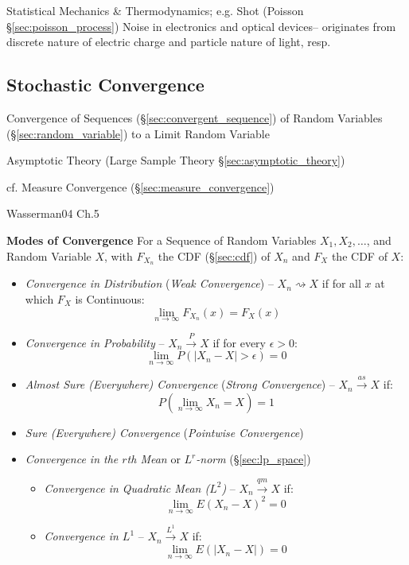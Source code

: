 Statistical Mechanics \& Thermodynamics; e.g. Shot (Poisson
\S\ref{sec:poisson_process}) Noise in electronics and optical devices--
originates from discrete nature of electric charge and particle nature of light,
resp.



\subsection{Stochastic Convergence}\label{sec:stochastic_convergence}

Convergence of Sequences (\S\ref{sec:convergent_sequence}) of Random Variables
(\S\ref{sec:random_variable}) to a Limit Random Variable

\fist Asymptotic Theory (Large Sample Theory \S\ref{sec:asymptotic_theory})

\fist cf. Measure Convergence (\S\ref{sec:measure_convergence})

Wasserman04 Ch.5

\textbf{Modes of Convergence}
For a Sequence of Random Variables $X_1, X_2, \ldots$, and Random Variable $X$,
with $F_{X_n}$ the CDF (\S\ref{sec:cdf}) of $X_n$ and $F_X$ the CDF of $X$:
\begin{itemize}
  \item \emph{Convergence in Distribution} (\emph{Weak Convergence}) --
    $X_n \rightsquigarrow X$ if for all $x$ at which $F_X$ is Continuous:
    \[
      \lim_{n\to\infty} F_{X_n}(x) = F_X(x)
    \]
  \item \emph{Convergence in Probability} -- $X_n \xrightarrow{P} X$ if for
    every $\epsilon > 0$:
    \[
      \lim_{n\to\infty}P(|X_n - X| > \epsilon) = 0
    \]
  \item \emph{Almost Sure (Everywhere) Convergence} (\emph{Strong Convergence})
    -- $X_n \xrightarrow{as} X$ if:
    \[
      P(\lim_{n\to\infty}X_n = X) = 1
    \]
  \item \emph{Sure (Everywhere) Convergence} (\emph{Pointwise Convergence})
  \item \emph{Convergence in the $r$th Mean} or \emph{$L^r$-norm}
    (\S\ref{sec:lp_space})
    \begin{itemize}
      \item \emph{Convergence in Quadratic Mean ($L^2$)} --
        $X_n \xrightarrow{qm} X$ if:
        \[
          \lim_{n\to\infty} E(X_n - X)^2 = 0
        \]
      \item \emph{Convergence in $L^1$} -- $X_n \xrightarrow{L^1} X$ if:
        \[
          \lim_{n\to\infty} E(|X_n - X|) = 0
        \]
    \end{itemize}
\end{itemize}


